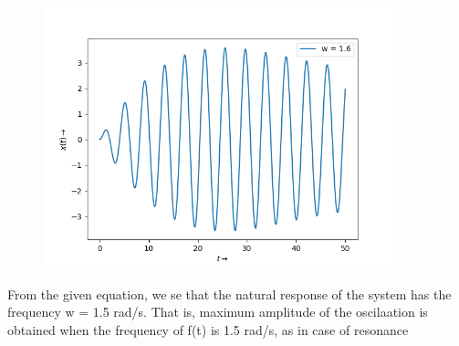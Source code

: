 \documentclass[10pt,a4paper]{article}
\begin{document}
\begin{figure}[!tbh]

\includegraphics[width = 0.9\textwidth]{3e.png}

\end{figure}

From the given equation, we se that the natural response of the system has the frequency w = 1.5 rad/s. That is, maximum amplitude of the oscilaation is obtained when the frequency of f(t) is 1.5 rad/s, as in case of resonance\\ \\ \\ \\ \\ \\ \\ \\ \\ \\ \\ \\ \\ \\ \\ \\ \\ \\ \\ \\ \\ \\ \\ \\ \\ \\ \\ \\ \\ \\ \\ \\ \\ \\ \\ \\ 
\end{document}
